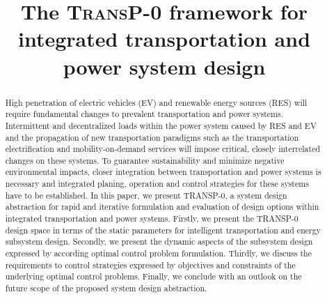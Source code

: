 \title{The \textsc{TransP-0} framework for integrated transportation and power system design}

\author{
	\and
}

\maketitle

\begin{abstract}
	High penetration of electric vehicles (EV) and renewable energy sources (RES) will require fundamental changes to prevalent transportation and power systems. Intermittent and decentralized loads within the power system caused by RES and EV and the propagation of new transportation paradigms such as the transportation electrification and mobility-on-demand services will impose critical, closely interrelated changes on these systems.
	To guarantee sustainability and minimize negative environmental impacts, closer integration between transportation and power systems is necessary and integrated planing, operation and control strategies for these systems have to be established. In this paper, we present TRANSP-0, a system design abstraction for rapid and iterative formulation and evaluation of design options within integrated transportation and power systems. Firstly, we present the TRANSP-0 design space in terms of the static parameters for intelligent transportation and energy subsystem design. Secondly, we present the dynamic aspects of the subsystem design expressed by according optimal control problem formulation. Thirdly, we discuss the requirements to control strategies expressed by objectives and constraints of the underlying optimal control problems. Finally, we conclude with an outlook on the future scope of the proposed system design abstraction.
	
\end{abstract}
